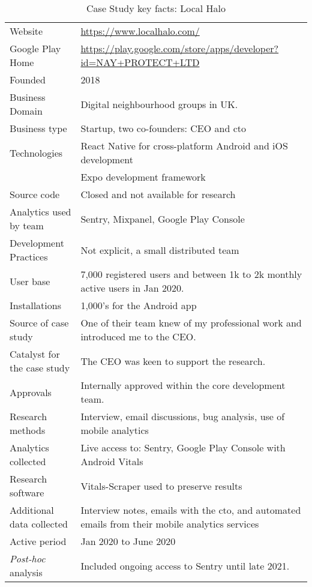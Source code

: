 {\renewcommand{\arraystretch}{0.8}%
\begin{table*}
    \centering
    \small
    \setlength{\tabcolsep}{6pt}
    \begin{tabular}{lp{11cm}}
       \toprule
       Website &\url{https://www.localhalo.com/} \\
       Google Play Home & \url{https://play.google.com/store/apps/developer?id=NAY+PROTECT+LTD} \\
       Founded &2018 \\
       Business Domain &Digital neighbourhood groups in UK.\\
       Business type &Startup, two co-founders: CEO and \acrshort{cto} \\
       Technologies  &React Native for cross-platform Android and iOS development \\
       &Expo development framework \\
       Source code  &Closed and not available for research \\
       Analytics used by team &Sentry, Mixpanel, Google Play Console \\
       Development Practices &Not explicit, a small distributed team \\
       \midrule
       User base &7,000 registered users and between 1k to 2k monthly active users in Jan 2020. \\
       Installations &1,000's for the Android app \\
       \midrule
       Source of case study &One of their team knew of my professional work and introduced me to the CEO. \\
       Catalyst for the case study &The CEO was keen to support the research. \\
       Approvals &Internally approved within the core development team. \\
       \midrule
       Research methods &Interview, email discussions, bug analysis, use of mobile analytics \\
       Analytics collected &Live access to: Sentry, Google Play Console with Android Vitals \\
       Research software &Vitals-Scraper used to preserve results \\
       Additional data collected &Interview notes, emails with the \acrshort{cto}, and automated emails from their mobile analytics services \\
       Active period &Jan 2020 to June 2020 \\
       \midrule
       \emph{Post-hoc} analysis &Included ongoing access to Sentry until late 2021. \\
       \bottomrule
    \end{tabular}
    \caption{Case Study key facts: Local Halo}
    \label{tab:local_halo_anaytics_overview}
\end{table*}
}

